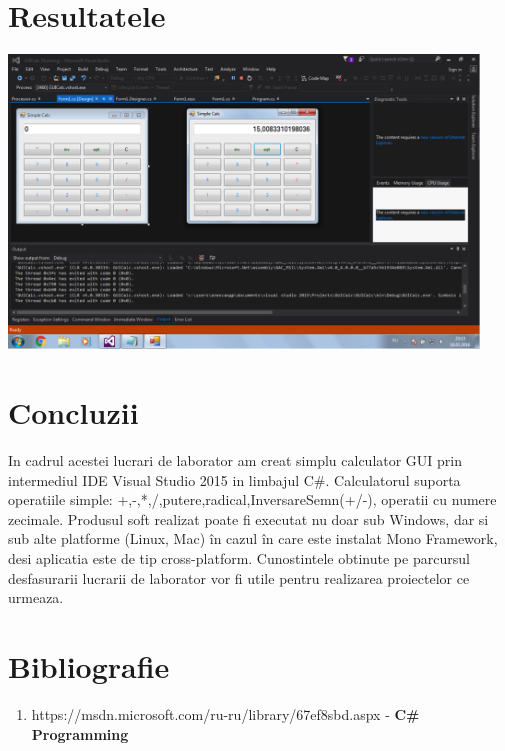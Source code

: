 \documentclass[12pt]{article}
\begin{document}
\section {Resultatele}
\includegraphics[width=12.5cm]{images/1}
\section*{Concluzii}
In cadrul acestei lucrari de laborator am creat simplu calculator GUI prin intermediul IDE Visual Studio 2015 in limbajul C\#. Calculatorul suporta operatiile simple: +,-,*,/,putere,radical,InversareSemn(+/-), operatii cu numere zecimale. Produsul soft realizat poate fi executat nu doar sub Windows, dar si sub alte platforme (Linux, Mac) în cazul în care este instalat Mono Framework, desi  aplicatia este de tip cross-platform. Cunostintele obtinute pe parcursul desfasurarii lucrarii de laborator vor fi utile pentru realizarea proiectelor ce urmeaza.
\section*{Bibliografie}
\begin{enumerate}
\item https://msdn.microsoft.com/ru-ru/library/67ef8sbd.aspx - \textbf{C\# Programming}
\end{enumerate}
\end{document}
